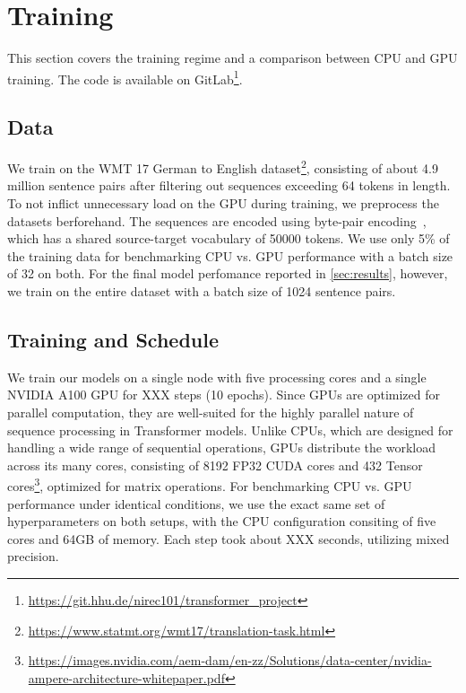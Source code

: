 \section{Training}
This section covers the training regime and a comparison between CPU and GPU training.
The code is available on GitLab\footnote{\url{https://git.hhu.de/nirec101/transformer_project}}.

\subsection{Data}
We train on the WMT 17 German to English dataset\footnote{\url{https://www.statmt.org/wmt17/translation-task.html}}, consisting of about 4.9 million sentence pairs after filtering out sequences exceeding 64 tokens in length.
To not inflict unnecessary load on the GPU during training, we preprocess the datasets berforehand.
The sequences are encoded using byte-pair encoding~\cite{britz2017massiveexplorationneuralmachine}, which has a shared source-target vocabulary of 50000 tokens.
We use only 5\% of the training data for benchmarking CPU vs. GPU performance with a batch size of 32 on both.
For the final model perfomance reported in \cref{sec:results}, however, we train on the entire dataset with a batch size of 1024 sentence pairs.

\subsection{Training and Schedule}
We train our models on a single node with five processing cores and a single NVIDIA A100 GPU for XXX steps (10 epochs).
Since GPUs are optimized for parallel computation, they are well-suited for the highly parallel nature of sequence processing in Transformer models.
Unlike CPUs, which are designed for handling a wide range of sequential operations, GPUs distribute the workload across its many cores, consisting of 8192 FP32 CUDA cores and 432 Tensor cores\footnote{\url{https://images.nvidia.com/aem-dam/en-zz/Solutions/data-center/nvidia-ampere-architecture-whitepaper.pdf}}, optimized for matrix operations.
For benchmarking CPU vs. GPU performance under identical conditions, we use the exact same set of hyperparameters on both setups, with the CPU configuration consiting of five cores and 64GB of memory.
Each step took about XXX seconds, utilizing mixed precision.


